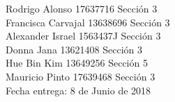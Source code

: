 \documentclass[12pt, letterpaper]{article}
\begin{document}
\vspace*{30mm}
\flushright 
	
Rodrigo Alonso	17637716 Sección 3\\
Francisca Carvajal	13638696 Sección 3\\
Alexander Israel	1563437J Sección 3\\
Donna Jana	13621408 Sección 3\\
Hue Bin Kim	13649256 Sección 5\\
Mauricio Pinto 17639468 Sección 3\\

 
\vspace*{5mm}
{\large Fecha entrega: 8 de Junio de 2018\\}

\newpage
\flushleft
\justify













\end{document}
